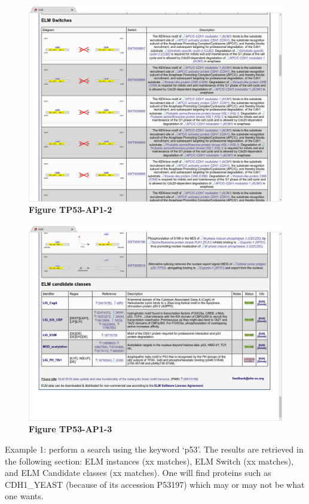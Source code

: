 \begin{figure}[h!]
\centering
\includegraphics[width=\textwidth]{Figures/TP53_3/TP53_switches.png} 
\caption{
\textbf{Figure TP53-AP1-2}
}
\end{figure}

\begin{figure}[h!]
\centering
\includegraphics[width=\textwidth]{Figures/TP53_3/TP53_candidates.png} 
\caption{
\textbf{Figure TP53-AP1-3}
}
\end{figure}

Example 1: perform a search using the keyword `p53'. The results are
retrieved in the following section: ELM instances (xx matches), ELM
Switch (xx matches), and ELM Candidate classes (xx matches). One will
find proteins such as CDH1\_YEAST (because of its accession P53197)
which may or may not be what one wants.

